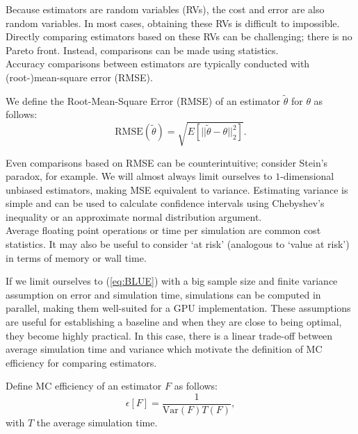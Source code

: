 \documentclass[a4paper,12pt]{article}
\begin{document}
Because estimators are random variables (RVs), the cost and error are also random
variables. In most cases, obtaining these RVs is difficult to impossible.
Directly comparing estimators based on these RVs can be challenging;
there is no Pareto front. Instead, comparisons can be made
using statistics. \\

Accuracy comparisons between estimators
are typically conducted with (root-)mean-square error (RMSE).
\begin{definition}
  We define the Root-Mean-Square Error (RMSE) of an estimator $\tilde{\theta}$ for $\theta$  as follows:
  \begin{equation}
    \text{RMSE}(\tilde{\theta}) = \sqrt{E[||\tilde{\theta}-\theta||^{2}_{2}]}.
  \end{equation}
\end{definition}

Even comparisons based on RMSE can be counterintuitive; consider Stein's paradox,
for example. We will almost always limit ourselves to $1$-dimensional
unbiased estimators, making MSE equivalent to variance.
Estimating variance is simple and can be used to calculate
confidence intervals using Chebyshev's inequality or an
approximate normal distribution argument.\\

Average floating point operations or time per simulation are common cost statistics.
It may also be useful to consider \enquote*{at risk}  (analogous to \enquote*{value at risk})
in terms of memory or wall time.

If we limit ourselves to (\ref{eq:BLUE}) with a big sample size and
finite variance assumption on error and simulation time,
simulations can be computed in parallel, making them well-suited for a GPU implementation.
These assumptions are useful for establishing a baseline and
when they are close to being optimal, they become highly practical.
In this case, there is a linear trade-off
between average simulation time and variance which motivate
the definition of MC efficiency for comparing estimators.

\begin{definition}
  Define MC efficiency of an
  estimator $F$ as follows:
  \begin{equation}
    \epsilon[F]=\frac{1}{\text{Var}(F) T(F)},
  \end{equation}
  with $T$ the average simulation time.
\end{definition}
\end{document}
